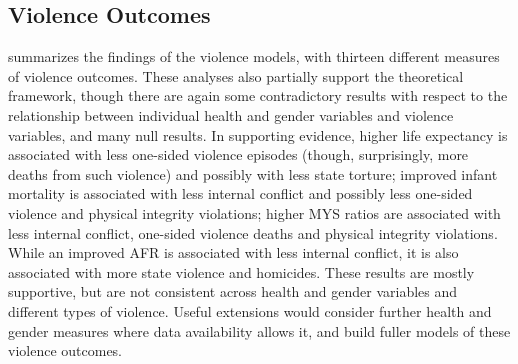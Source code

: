 \documentclass[12pt]{article}
\begin{document}
\subsection{Violence Outcomes}




 summarizes the findings of the violence models, with thirteen different measures of violence outcomes.
These analyses also partially support the theoretical framework, though there are again some contradictory results with respect to the relationship between individual health and gender variables and violence variables, and many null results.
In supporting evidence, higher life expectancy is associated with less one-sided violence episodes (though, surprisingly, more deaths from such violence) and possibly with less state torture; improved infant mortality is associated with less internal conflict and possibly less one-sided violence and physical integrity violations; higher MYS ratios are associated with less internal conflict, one-sided violence deaths and physical integrity violations.
While an improved AFR is associated with less internal conflict, it is also associated with more state violence and homicides.
These results are mostly supportive, but are not consistent across health and gender variables and different types of violence.
Useful extensions would consider further health and gender measures where data availability allows it, and build fuller models of these violence outcomes.
\end{document}
